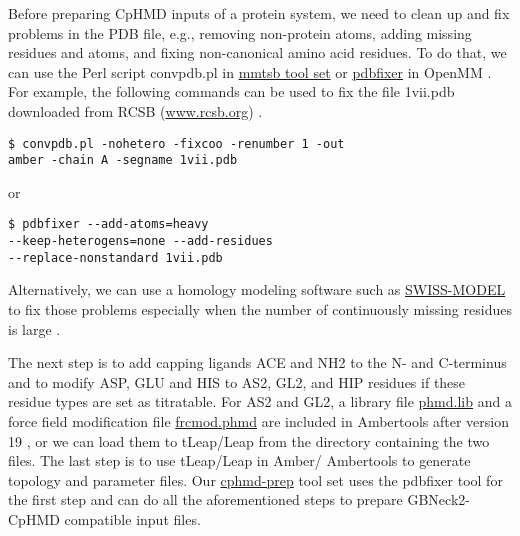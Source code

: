 Before preparing CpHMD inputs of a protein system, 
we need to clean up and fix problems in the PDB file,
e.g., removing non-protein atoms, adding missing residues and atoms, and fixing non-canonical amino acid residues. 
To do that, we can use the Perl script convpdb.pl in \href{http://blue11.bch.msu.edu/mmtsb/Main_Page}{mmtsb tool set} \cite{Feig_Brooks_2004_J.Mol.Graph.Model.} or \href{https://github.com/openmm/pdbfixer}{pdbfixer} in OpenMM \cite{Eastman_Pande_2017_PLoSComput.Biol.}. 
For example, the following commands can be used 
to fix the file 1vii.pdb downloaded from RCSB (\href{www.rcsb.org}{www.rcsb.org}) \cite{Berman_Bourne_2000_NucleicAcidsRes.}.  
\begin{lstlisting}
$ convpdb.pl -nohetero -fixcoo -renumber 1 -out
amber -chain A -segname 1vii.pdb 
\end{lstlisting}
or 
\begin{lstlisting}
$ pdbfixer --add-atoms=heavy 
--keep-heterogens=none --add-residues
--replace-nonstandard 1vii.pdb
\end{lstlisting}
 Alternatively, we can use a homology modeling software such as \href{https://swissmodel.expasy.org/}{SWISS-MODEL} \cite{Waterhouse_Schwede_2018_NucleicAcidsRes.} to fix those problems especially when the number of continuously missing residues is large \cite{Waterhouse_Schwede_2018_NucleicAcidsRes.}.
 
 The next step is to add capping ligands ACE and NH2 to the N- and C-terminus and to modify ASP, GLU and HIS to AS2, GL2, and HIP residues if these residue types are set as titratable. For AS2 and GL2, a library file \href{https://gitlab.com/shenlab-amber-cphmd/cphmd-prep/-/blob/master/Files/phmd.lib}{phmd.lib} and a force field modification file \href{https://gitlab.com/shenlab-amber-cphmd/cphmd-prep/-/blob/master/Files/frcmod.phmd}{frcmod.phmd} are included in Ambertools after version 19 \cite{Case_Kollman_2018_}, or we can load them to tLeap/Leap from the directory containing the two files. The last step is to use tLeap/Leap in Amber/ Ambertools to generate topology and parameter files. Our \href{https://gitlab.com/shenlab-amber-cphmd/cphmd-prep}{cphmd-prep} tool set uses the pdbfixer tool for the first step and can do all the aforementioned steps to prepare GBNeck2-CpHMD compatible input files. 

